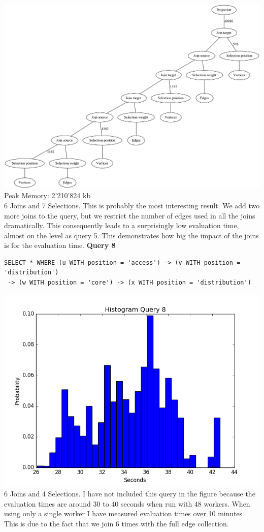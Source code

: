 \documentclass[11pt,singlecolumn]{scrartcl}
\begin{document}
\includegraphics[width=1\textwidth]{graph7}
Peak Memory: 2'210'824 kb \\
6 Joins and 7 Selections. This is probably the most interesting result. We add two more joins to the query, but we restrict the number of edges used in all the joins dramatically. This consequently leads to a surprisingly low evaluation time, almost on the level as query 5. This demonstrates how big the impact of the joins is for the evaluation time.
\clearpage
\textbf{Query 8}\\
\begin{verbatim}
SELECT * WHERE (u WITH position = 'access') -> (v WITH position = 'distribution')
 -> (w WITH position = 'core') -> (x WITH position = 'distribution')\end{verbatim}
\includegraphics[width=1\textwidth]{q81}
6 Joins and 4 Selections. I have not included this query in the figure because the evaluation times are around 30 to 40 seconds when run with 48 workers. When using only a single worker I have measured evaluation times over 10 minutes. This is due to the fact that we join 6 times with the full edge collection.
\clearpage
\end{document}

